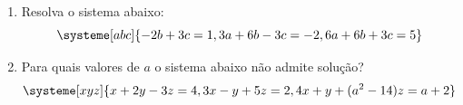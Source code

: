 \documentclass[a4paper,5pt]{amsbook}
\begin{document}
\begin{enumerate}
	\vspace{0.5cm}
	\item Resolva o sistema abaixo:
		\[\systeme[abc]{
				-2b + 3c = 1,
				3a + 6b - 3c = -2,
				6a + 6b + 3c = 5
			}\]


	\vspace{0.5cm}
	\item Para quais valores de $a$ o sistema abaixo n\~ao admite solu\c{c}\~ao?
		\[\systeme[xyz]{
				x + 2y - 3z = 4,
				3x - y + 5z = 2,
				4x + y + {(a^2-14)}z = a+2
			}\]
\end{enumerate}
\end{document}
